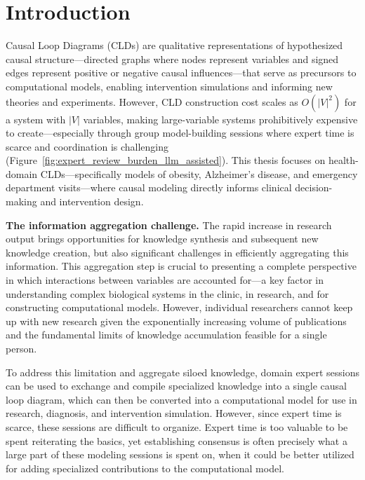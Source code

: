 \section{Introduction}
\label{sec:introduction}

Causal Loop Diagrams (CLDs) are qualitative representations of hypothesized causal structure---directed graphs where nodes represent variables and signed edges represent positive or negative causal influences---that serve as precursors to computational models, enabling intervention simulations and informing new theories and experiments. However, CLD construction cost scales as $O(|V|^2)$ for a system with $|V|$ variables, making large-variable systems prohibitively expensive to create---especially through group model-building sessions where expert time is scarce and coordination is challenging (Figure~\ref{fig:expert_review_burden_llm_assisted}). This thesis focuses on health-domain CLDs---specifically models of obesity, Alzheimer's disease, and emergency department visits---where causal modeling directly informs clinical decision-making and intervention design.

\medskip
\noindent
\textbf{The information aggregation challenge.} The rapid increase in research output brings opportunities for knowledge synthesis and subsequent new knowledge creation, but also significant challenges in efficiently aggregating this information. This aggregation step is crucial to presenting a complete perspective in which interactions between variables are accounted for---a key factor in understanding complex biological systems in the clinic, in research, and for constructing computational models. However, individual researchers cannot keep up with new research given the exponentially increasing volume of publications and the fundamental limits of knowledge accumulation feasible for a single person.

To address this limitation and aggregate siloed knowledge, domain expert sessions can be used to exchange and compile specialized knowledge into a single causal loop diagram, which can then be converted into a computational model for use in research, diagnosis, and intervention simulation. However, since expert time is scarce, these sessions are difficult to organize. Expert time is too valuable to be spent reiterating the basics, yet establishing consensus is often precisely what a large part of these modeling sessions is spent on, when it could be better utilized for adding specialized contributions to the computational model.

